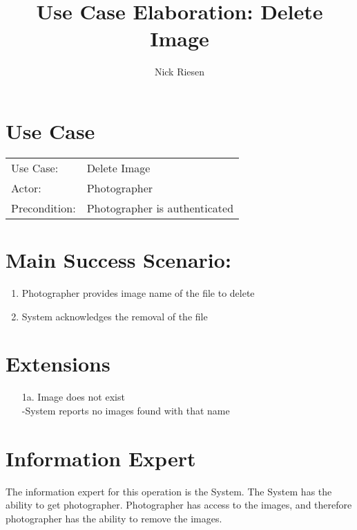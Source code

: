 \documentclass{article}
\title{Use Case Elaboration: Delete Image}
\author{ Nick Riesen }
\begin{document}
\maketitle


\section*{Use Case}
\begin{tabular}{l l}
Use Case:     & Delete Image                  \\
Actor:        & Photographer                  \\
Precondition: & Photographer is authenticated \\
\end{tabular}


\section*{Main Success Scenario:}

\begin{enumerate}
    \item Photographer provides image name of the file to delete
    \item System acknowledges the removal of the file

\end{enumerate}

\section*{Extensions}

\begin{itemize}
    \item [1a.] Image does not exist \\
        -System reports no images found with that name
                            
\end{itemize}


\section*{Information Expert}
The information expert for this operation is the System. The System has the ability to get photographer. Photographer has access to the images, and therefore photographer has the ability to remove the images.
\end{document}
